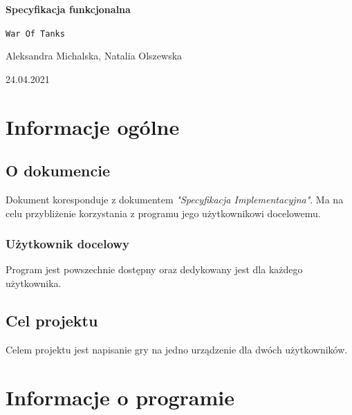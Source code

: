 \documentclass[a4paper]{article}
\begin{document}
\begin{titlepage}
	\begin{center}
		\vspace*{5cm}

	        \Huge
        	\textbf{Specyfikacja funkcjonalna}

        	\vspace{1cm}
	        \Huge
        	\texttt{War Of Tanks}

    		\vspace{1.5cm}

	        \large
		    Aleksandra Michalska, Natalia Olszewska

        	\vfill

	        \vspace{3cm}

		\large 24.04.2021
	\end{center}
\end{titlepage}

\tableofcontents

\newpage



\section{Informacje og\'olne}

\subsection{O dokumencie}
\quad Dokument koresponduje z dokumentem \textit{"Specyfikacja Implementacyjna"}. 
Ma na celu przybli\.zenie korzystania z programu jego u\.zytkownikowi docelowemu.
\subsubsection{U\.zytkownik docelowy}
\quad Program jest powszechnie dost\k{e}pny oraz dedykowany jest dla ka\.zdego u\.zytkownika.

\subsection{Cel projektu}
\quad Celem projektu jest napisanie gry na jedno urz\k{a}dzenie dla dw\'och u\.zytkownik\'ow. 










\section{Informacje o programie}
\end{document}
